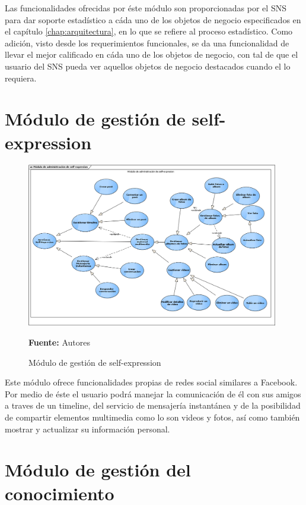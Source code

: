 Las funcionalidades ofrecidas por éste módulo son proporcionadas por el SNS para dar soporte estadístico a cáda uno de los objetos de negocio especificados en el capítulo \ref{chap:arquitectura}, en lo que se refiere al proceso estadístico. Como adición, visto desde los requerimientos funcionales, se da una funcionalidad de llevar el mejor calificado en cáda uno de los objetos de negocio, con tal de que el usuario del SNS pueda ver aquellos objetos de negocio destacados cuando el lo requiera.

\clearpage

\section{Módulo de gestión de self-expression}

\begin{figure}[!htb]
  \begin{center}
    \includegraphics[width=11cm]{./imagenes/casos_uso/gestion_self_sharing.png}
    \caption{Módulo de gestión de self-expression}
    \label{fig:cu_self_shar}
    \textbf{Fuente:} Autores
  \end{center}
\end{figure}

Este módulo ofrece funcionalidades propias de redes social similares a Facebook. Por medio de éste el usuario podrá manejar la comunicación de él con sus amigos a traves de un timeline, del servicio de mensajería instantánea y de la posibilidad de compartir elementos multimedia como lo son videos y fotos, así como también mostrar y actualizar su información personal.

\section{Módulo de gestión del conocimiento}

